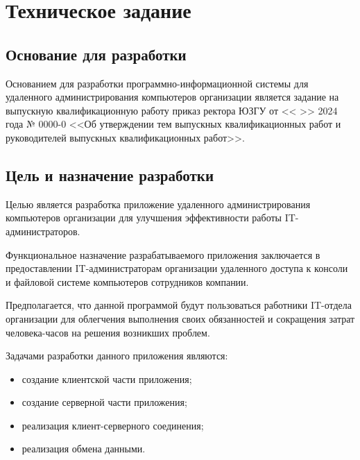 \newsection
\section{Техническое задание}
\subsection{Основание для разработки}
Основанием для разработки программно-информационной системы для удаленного администрирования компьютеров организации является задание на выпускную квалификационную работу приказ ректора ЮЗГУ от <<  >>     2024 года № 0000-0 <<Об утверждении тем выпускных квалификационных работ и руководителей выпускных квалификационных работ>>.

\subsection{Цель и назначение разработки}
Целью является разработка приложение удаленного администрирования компьютеров организации для улучшения эффективности работы IT-администраторов. 

Функциональное назначение разрабатываемого приложения заключается в предоставлении IT-администраторам организации удаленного доступа к консоли и файловой системе компьютеров сотрудников компании.

Предполагается, что данной программой будут пользоваться работники IT-отдела организации для облегчения выполнения своих обязанностей и сокращения затрат человека-часов на решения возникших проблем.

Задачами разработки данного приложения являются:
\begin{itemize}
	\item создание клиентской части приложения;
	\item создание серверной части приложения;
	\item реализация клиент-серверного соединения;
	\item реализация обмена данными.
\end{itemize}

